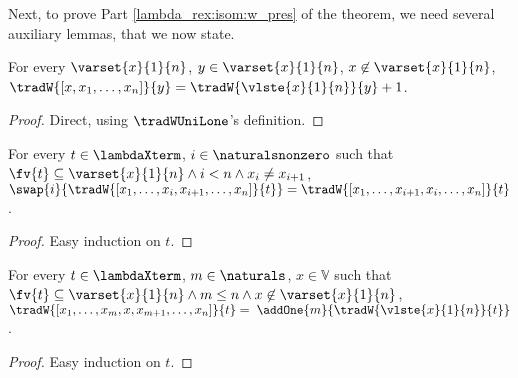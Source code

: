 Next, to prove Part \ref{lambda_rex:isom:w_pres} of the theorem, we need
several auxiliary lemmas, that we now state.

\begin{lemma}\label{lambda_re:lema:w_variable_no_primera_en_lista}
For every $\varset{x}{1}{n}$, $y \in \varset{x}{1}{n}$, $x \not\in \varset{x}{1}{n}$,
$\tradW{\left[ x, x_1, \ldots, x_n \right]}{y} = \tradW{\vlste{x}{1}{n}}{y} + 1$.
    \begin{proof}
    \vspace{-.07cm}
    Direct, using $\tradWUniLone$'s definition.
    \end{proof}
\end{lemma}

\begin{lemma}\label{lambda_re:lema:w_swap}
For every $t \in \lambdaXterm$, $i \in \naturalsnonzero$ such that $\fv{t} \subseteq \varset{x}{1}{n} \land i < n \land x_i \neq x_{i+1}$,\\
$\swap{i}{\tradW{\left[ x_1, \ldots, x_i, x_{i+1}, \ldots, x_n \right]}{t}} = \tradW{\left[ x_1, \ldots, x_{i+1}, x_i, \ldots, x_n \right]}{t}$.
    \begin{proof}
    \vspace{-.07cm}
    Easy induction on $t$.
    \end{proof}
\end{lemma}

\begin{lemma}\label{lambda_re:lema:w_incrementos}
For every $t \in \lambdaXterm$, $m \in \naturals$, $x \in \mathbb{V}$ such that $\fv{t} \subseteq \varset{x}{1}{n} \land m \leq n \land x \not\in \varset{x}{1}{n}$, \\
$\tradW{\left[ x_1, \ldots, x_m, x, x_{m+1}, \ldots, x_n \right]}{t} = \; \addOne{m}{\tradW{\vlste{x}{1}{n}}{t}}$.
    \begin{proof}
    \vspace{-.07cm}
    Easy induction on $t$.
    \end{proof}
\end{lemma}

